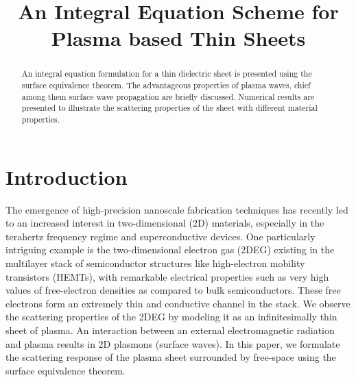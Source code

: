 \documentclass[conference, 10pt]{IEEEtran}
\renewcommand{\^}{\hat}  %
\begin{document}
\title{An Integral Equation Scheme for Plasma based Thin Sheets}


\maketitle


%
\begin{abstract}
  An integral equation formulation for a thin dielectric sheet is presented using the surface equivalence theorem. The advantageous properties of plasma waves, chief among them surface wave propagation are briefly discussed. Numerical results are presented to illustrate the scattering properties of the sheet with different material properties.
\end{abstract}

\IEEEpeerreviewmaketitle
\section{Introduction}

The emergence of high-precision nanoscale fabrication techniques has recently led to an increased interest in two-dimensional (2D) materials, especially in the terahertz frequency regime and superconductive devices. One particularly intriguing example is the two-dimensional electron gas (2DEG) existing in the multilayer stack of semiconductor structures like high-electron mobility transistors (HEMTs), with remarkable electrical properties such as very high values of free-electron densities as compared to bulk semiconductors. These free electrons form an extremely thin and conductive channel in the stack. We observe the scattering properties of the 2DEG by modeling it as an infinitesimally thin sheet of plasma. An interaction between an external electromagnetic radiation and plasma results in 2D plasmons (surface waves). In this paper, we formulate the scattering response of the plasma sheet surrounded by free-space using the surface equivalence theorem.
\end{document}

